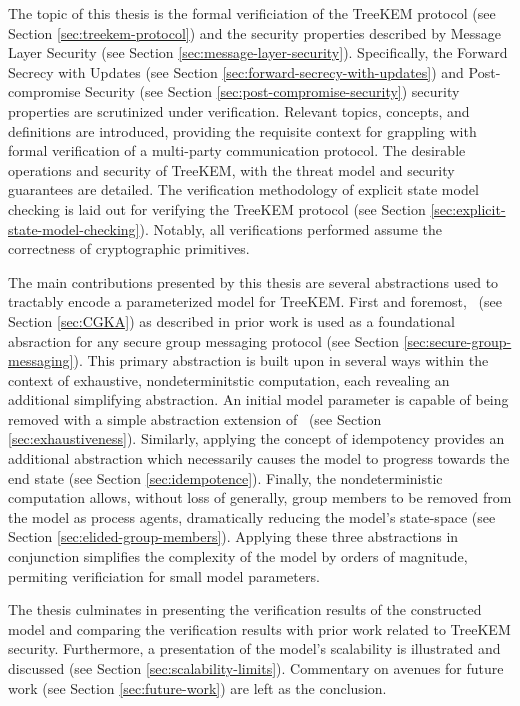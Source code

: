 The topic of this thesis is the formal verificiation of the TreeKEM protocol (see Section \ref{sec:treekem-protocol}) and the security properties described by Message Layer Security (see Section \ref{sec:message-layer-security}).
Specifically, the Forward Secrecy with Updates (see Section \ref{sec:forward-secrecy-with-updates}) and Post-compromise Security (see Section \ref{sec:post-compromise-security}) security properties are scrutinized under verification.
Relevant topics, concepts, and definitions are introduced, providing the requisite context for grappling with formal verification of a multi-party communication protocol.
The desirable operations and security of TreeKEM, with the threat model and security guarantees are detailed.
The verification methodology of explicit state model checking is laid out for verifying the TreeKEM protocol (see Section \ref{sec:explicit-state-model-checking}).
Notably, all verifications performed assume the correctness of cryptographic primitives.

The main contributions presented by this thesis are several abstractions used to tractably encode a parameterized model for TreeKEM.
First and foremost, \CGKAdef\ (see Section \ref{sec:CGKA}) as described in prior work \autocite{alwen2020security} is used as a foundational absraction for any secure group messaging protocol (see Section \ref{sec:secure-group-messaging}).
This primary abstraction is built upon in several ways within the context of exhaustive, nondeterminitstic computation, each revealing an additional simplifying abstraction.
An initial model parameter is capable of being removed with a simple abstraction extension of \CGKAdef\ (see Section \ref{sec:exhaustiveness}).
Similarly, applying the concept of idempotency provides an additional abstraction which necessarily causes the model to progress towards the end state (see Section \ref{sec:idempotence}).
Finally, the nondeterministic computation allows, without loss of generally, group members to be removed from the model as process agents, dramatically reducing the model's state-space (see Section \ref{sec:elided-group-members}).
Applying these three abstractions in conjunction simplifies the complexity of the model by orders of magnitude, permiting verificiation for small model parameters.

The thesis culminates in presenting the verification results of the constructed model and comparing the verification results with prior work related to TreeKEM security.
Furthermore, a presentation of the model's scalability is illustrated and discussed (see Section \ref{sec:scalability-limits}).
Commentary on avenues for future work (see Section \ref{sec:future-work}) are left as the conclusion.


